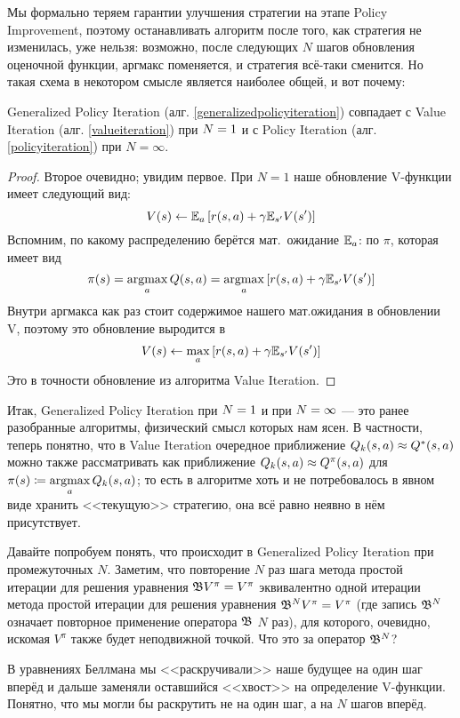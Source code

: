 Мы формально теряем гарантии улучшения стратегии на этапе Policy Improvement, поэтому останавливать алгоритм после того, как стратегия не изменилась, уже нельзя: возможно, после следующих $N$ шагов обновления оценочной функции, аргмакс поменяется, и стратегия всё-таки сменится. Но такая схема в некотором смысле является наиболее общей, и вот почему:

\begin{proposition}
Generalized Policy Iteration (алг. \ref{generalizedpolicyiteration}) совпадает с Value Iteration (алг. \ref{valueiteration}) при $N \HM= 1$ и с Policy Iteration (алг. \ref{policyiteration}) при $N = \infty$.
\begin{proof}
Второе очевидно; увидим первое. При $N = 1$ наше обновление V-функции имеет следующий вид:
$$V(s) \leftarrow \mathbb{E}_{a} \left[ r(s, a) + \gamma \mathbb{E}_{s'} V(s') \right]$$
Вспомним, по какому распределению берётся мат.~ожидание $\mathbb{E}_a$: по $\pi$, которая имеет вид 
$$\pi(s) = \mathop{\mathrm{argmax}}\limits_a Q(s, a) = \mathop{\mathrm{argmax}}\limits_a \left[ r(s, a) + \gamma \mathbb{E}_{s'} V(s') \right]$$
Внутри аргмакса как раз стоит содержимое нашего мат.ожидания в обновлении V, поэтому это обновление выродится в
$$V(s) \leftarrow \max\limits_{a} \left[ r(s, a) + \gamma \mathbb{E}_{s'} V(s') \right]$$
Это в точности обновление из алгоритма Value Iteration.
\end{proof}
\end{proposition}

Итак, Generalized Policy Iteration при $N \HM= 1$ и при $N \HM= \infty$ --- это ранее разобранные алгоритмы, физический смысл которых нам ясен. В частности, теперь понятно, что в Value Iteration очередное приближение $Q_k(s, a) \HM\approx Q^*(s,a)$ можно также рассматривать как приближение $Q_k(s, a) \HM \approx Q^{\pi}(s, a)$ для $\pi(s) \HM \coloneqq \argmax\limits_{a} Q_k(s, a)$; то есть в алгоритме хоть и не потребовалось в явном виде хранить <<текущую>> стратегию, она всё равно неявно в нём присутствует. 

Давайте попробуем понять, что происходит в Generalized Policy Iteration при промежуточных $N$. Заметим, что повторение $N$ раз шага метода простой итерации для решения уравнения $\B V^\pi \HM= V^\pi$ эквивалентно одной итерации метода простой итерации для решения уравнения $\B^N V^\pi \HM= V^\pi$ (где запись $\mathfrak{B}^N$ означает повторное применение оператора $\mathfrak{B}$ $N$ раз), для которого, очевидно, искомая $V^{\pi}$ также будет неподвижной точкой. Что это за оператор $\mathfrak{B}^N$? 

В уравнениях Беллмана мы <<раскручивали>> наше будущее на один шаг вперёд и дальше заменяли оставшийся <<хвост>> на определение V-функции. Понятно, что мы могли бы раскрутить не на один шаг, а на $N$ шагов вперёд.

